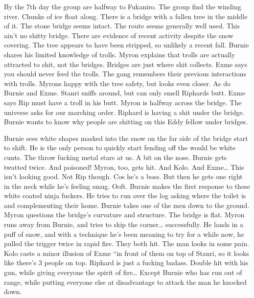 By the 7th day the group are halfway to Fukaniro. The group find the winding river. Chunks of ice float along. There is a bridge with a fallen tree in the middle of it. The stone bridge seems intact. The route seems generally well used. This ain't no shitty bridge. There are evidence of recent activity despite the snow covering. The tree appears to have been stripped, so unlikely a recent fall. Burnie shares his limited knowledge of trolls. Myron explains that trolls are actually attracted to shit, not the bridges. Bridges are just where shit collects. Exme says you should never feed the trolls. The gang remembers their previous interactions with trolls. Myrons happy with the tree safety, but looks even closer. As do Burnie and Exme. Stanri sniffs around, but can only smell Riphards butt. Exme says Rip must have a troll in his butt. Myron is halfway across the bridge. The universe asks for our marching order. Riphard is having a shit under the bridge. Burnie wants to know why people are shitting on this Eddy fellow under bridges.\medskip

Burnie sees white shapes masked into the snow on the far side of the bridge start to shift. He is the only person to quickly start fending off the would be white cunts. The throw fucking metal stars at us. A bit on the nose. Burnie gets twatted twice. And poisoned! Myron, too, gets hit. And Kolo. And Exme… This isn’t looking good. Not Rip though. Cos he’s a boss. But then he gets one right in the neck while he’s feeling smug. Ooft. Burnie makes the first response to these white coated ninja fuckers. He tries to run over the log asking where the toilet is and complementing their home. Burnie takes one of the men down to the ground. Myron questions the bridge’s curvature and structure. The bridge is flat. Myron runs away from Burnie, and tries to skip the corner… successfully. He lands in a puff of snow, and with a technique he’s been meaning to try for a while now, he pulled the trigger twice in rapid fire. They both hit. The man looks in some pain. Kolo casts a minor illusion of Exme “in front of them on top of Stanri, so it looks like there’s 3 people on top. Riphard is just a fucking badass. Double hit with his gun, while giving everyone the spirit of fire… Except Burnie who has run out of range, while putting everyone else at disadvantage to attack the man he knocked down.\medskip

